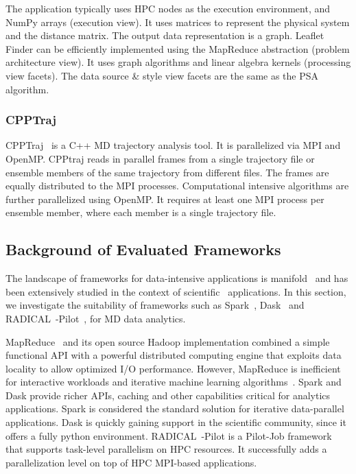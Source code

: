The application typically uses HPC nodes as the execution environment, and NumPy arrays (execution view).
It uses matrices to represent the physical system and the distance matrix.
The output data representation is a graph.
Leaflet Finder can be efficiently implemented using the MapReduce abstraction (problem architecture view).
It uses graph algorithms and linear algebra kernels (processing view facets).
The data source \& style view facets are the same as the PSA algorithm.

\subsubsection{CPPTraj}
CPPTraj~\cite{roe2013ptraj,roe2018parallelization} is a C++ MD trajectory analysis tool.
It is parallelized via MPI and OpenMP.
CPPtraj reads in parallel frames from a single trajectory file or ensemble members of the same trajectory from different files.
The frames are equally distributed to the MPI processes.
Computational intensive algorithms are further parallelized using OpenMP.
It requires at least one MPI process per ensemble member, where each member is a single trajectory file.

\subsection{Background of Evaluated Frameworks}
\label{frameworks}
The landscape of frameworks for data-intensive applications is manifold~\cite{jha2014tale,kamburugamuve2017anatomy} and has been extensively studied in the context of scientific~\cite{jha2017introducing} applications.
In this section, we investigate the suitability of frameworks such as Spark~\cite{zaharia2010spark}, Dask~\cite{rocklin2015dask} and RADICAL~-Pilot~\cite{merzky2019using}, for MD data analytics.

MapReduce~\cite{dean2004mapreduce} and its open source Hadoop implementation combined a simple functional API with a powerful distributed computing engine that exploits data locality to allow optimized I/O performance.
However, MapReduce is inefficient for interactive workloads and iterative machine learning algorithms~\cite{zaharia2010spark,ekanayake2010twister}.
Spark and Dask provide richer APIs, caching and other capabilities critical for analytics applications.
Spark is considered the standard solution for iterative data-parallel applications.
Dask is quickly gaining support in the scientific community, since it offers a fully python environment.
RADICAL~-Pilot is a Pilot-Job framework~\cite{luckow2012pstar} that supports task-level parallelism on HPC resources.
It successfully adds a parallelization level on top of HPC MPI-based applications.


